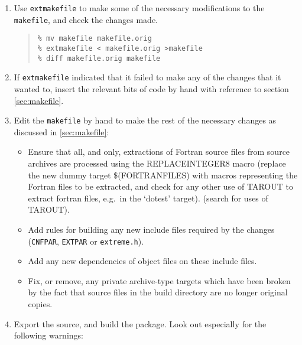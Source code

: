 \documentclass[twoside,11pt]{article}
\newcommand{\htmlref}[2]{#1}
\newcommand{\html}[1]{}
\renewcommand{\_}{\texttt{\symbol{95}}}
\newcommand{\xroutine}[1]{\htmlref{{\tt #1}}{#1}}
\newcommand{\file}[1]{{\tt #1}}
\newcommand{\routine}[1]{{\tt #1}}
\newenvironment{squote}{\begin{quote}\begin{small}}{\end{small}\end{quote}}
\begin{document}
\begin{enumerate}
\begin{squote}
\begin{verbatim}
\end{verbatim}
\end{squote}
to the new alpha\_OSF1\_64 and sun4\_Solaris\_64 stanzas of the \file{mk} file
respectively, or generate new platform-dependent files for the 
two new platforms.
\html{\begin{squote}\end{squote}}
%
\item
Use \xroutine{extmakefile} to make some of the necessary modifications 
to the \file{makefile}, and check the changes made.
\begin{squote}
\begin{verbatim}
% mv makefile makefile.orig
% extmakefile < makefile.orig >makefile
% diff makefile.orig makefile
\end{verbatim}
\end{squote}
%
\item
If \routine{extmakefile} indicated that it failed to make any of the
changes that it wanted to, insert the relevant bits of code by hand
with reference to section \ref{sec:makefile}.
\html{\begin{squote}\end{squote}}
%
\item
Edit the \file{makefile} by hand to make the rest of the necessary changes
as discussed in \ref{sec:makefile}:
\begin{itemize}
\item
Ensure that all, and only, 
extractions of Fortran source files from source archives
are processed using the REPLACE\_INTEGER8 macro 
(replace the new dummy target \$(FORTRAN\_FILES) with macros representing
the Fortran files to be extracted, and check for any other 
use of TAR\_OUT to extract fortran files, e.g.\ in the `do\_test' target).
(search for uses of TAR\_OUT).
\item
Add rules for building any new include files required by the changes
(\file{CNF\_PAR}, \file{EXT\_PAR} or \file{extreme.h}).
\item
Add any new dependencies of object files on these include files.
\item
Fix, or remove, any private archive-type targets which have been broken
by the fact that source files in the build directory are no longer
original copies.
\end{itemize}
\html{\begin{squote}\end{squote}}
%
\item
Export the source, and build the package. 
Look out especially for the following warnings:

\end{enumerate}
\end{document}
